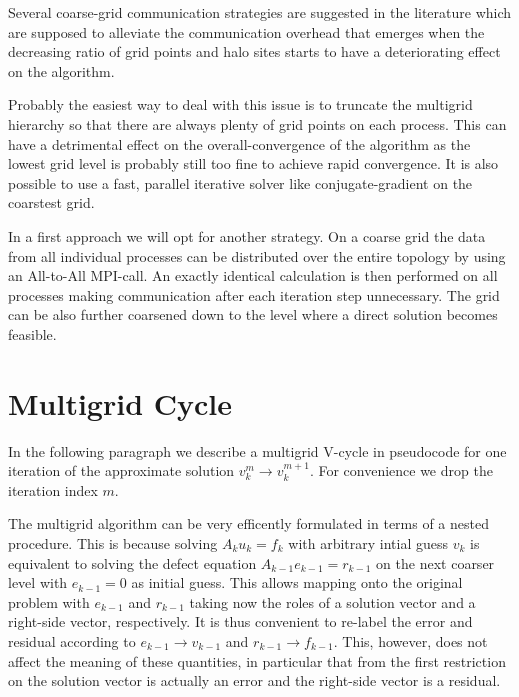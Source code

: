 \documentclass[11pt, oneside, a4paper]{article}
\begin{document}
Several coarse-grid communication strategies are suggested in the literature which are supposed to alleviate the communication overhead that emerges when the decreasing ratio of grid points and halo sites starts to have a deteriorating effect on the algorithm. 

Probably the easiest way to deal with this issue is to truncate the multigrid hierarchy so that there are always plenty of grid points on each process. This can have a detrimental effect on the overall-convergence of the algorithm as the lowest grid level is probably still too fine to achieve rapid convergence. It is also possible to use a fast, parallel iterative solver like conjugate-gradient on the coarstest grid. 

In a first approach we will opt for another strategy. On a coarse grid the data from all individual processes can be distributed over the entire topology by using an All-to-All MPI-call. An exactly identical calculation is then performed on all processes making communication after each iteration step unnecessary. The grid can be also further coarsened down to the level where a direct solution becomes feasible.


\section{Multigrid Cycle}

In the following paragraph we describe a multigrid V-cycle in pseudocode for one iteration of the approximate solution $v_k^m\rightarrow v_k^{m+1}$. For convenience we drop the iteration index $m$.

The multigrid algorithm can be very efficently formulated in terms of a nested procedure. This is because solving $A_k u_k = f_k$ with arbitrary intial guess $v_k$ is equivalent to solving the defect equation $A_{k-1} e_{k-1} = r_{k-1}$ on the next coarser level with $e_{k-1}=0$ as initial guess. This allows mapping onto the original problem with $e_{k-1}$ and $r_{k-1}$ taking now the roles of a solution vector and a right-side vector, respectively. It is thus convenient to re-label the error and residual according to $e_{k-1}\rightarrow v_{k-1}$ and $r_{k-1}\rightarrow f_{k-1}$. This, however, does not affect the meaning of these quantities, in particular that from the first restriction on the solution vector is actually an error and the right-side vector is a residual. 
 
\end{document}
